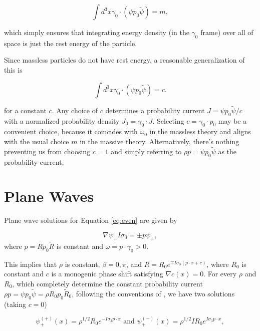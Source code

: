 \documentclass{article}
\begin{document}
  \begin{equation}
    \int d^3x \gamma_0 \cdot (\psi p_0 \widetilde \psi) = m,
  \end{equation}

  which simply ensures that integrating energy density (in the $\gamma_0$ frame) over all of space is just the rest energy of the particle.

  Since massless particles do not have rest energy, a reasonable generalization of this is

  \begin{equation}
    \int d^3x \gamma_0 \cdot (\psi p_0 \widetilde \psi) = c. \label{eq:normalization}
  \end{equation}

  for a constant $c$. Any choice of $c$ determines a probability current $J = \psi p_0 \widetilde \psi / c$ with a normalized probability density $J_0 = \gamma_0 \cdot J$. Selecting $c = \gamma_0 \cdot p_0$ may be a convenient choice, because it coincides with $\omega_0$ in the massless theory and aligns with the usual choice $m$ in the massive theory. Alternatively, there's nothing preventing us from choosing $c = 1$ and simply referring to $\rho p = \psi p_0 \widetilde \psi$ as the probability current.

  \section{Plane Waves} \label{waves}

  Plane wave solutions for Equation \ref{eq:even} are given by

  \begin{equation}
    \nabla \psi_+ I \sigma_3 = \pm p \psi_+,\label{eq:plane}
  \end{equation}
  where $p = R p_0 \widetilde R$ is constant and $\omega = p \cdot \gamma_0 > 0$.

  This implies that $\rho$ is constant, $\beta = 0, \pi$, and $R = R_0 e^{\mp I \sigma_3 (p \cdot x + c)}$, where $R_0$ is constant and $c$ is a monogenic phase shift satisfying $\nabla c(x) = 0$. For every $\rho$ and $R_0$, which completely determine the constant probability current $\rho p = \psi p_0 \widetilde \psi = \rho R_0 p_0 \widetilde R_0$, following the conventions of \cite{gap}, we have two solutions (taking $c = 0$)

  \begin{equation}
    \psi^{(+)}_+(x) = \rho^{1/2} R_0 e^{- I \sigma_3 p \cdot x} \text { and } \psi^{(-)}_+(x) = \rho^{1/2} I R_0 e^{I \sigma_3 p \cdot x},
  \end{equation} 
\end{document}
